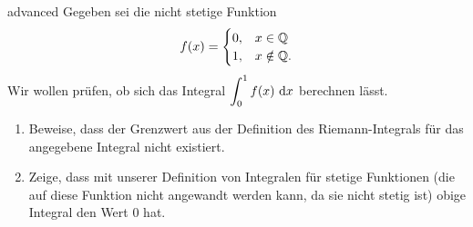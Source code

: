 \documentclass[../lineare_gleichungen.tex]{subfiles}
\begin{document}
\begin{exercise}{advanced}
    Gegeben sei die nicht stetige Funktion
    \[f(x)=\begin{cases}
        0,&x\in\mathbb{Q}\\
        1,&x\notin\mathbb{Q}.
    \end{cases}\]
    Wir wollen prüfen, ob sich das Integral
    $\displaystyle\int_0^1f(x)\mathop{}\mathrm{d} x$
    berechnen lässt.
    \begin{enumerate}
        \item Beweise, dass der Grenzwert aus der Definition des Riemann-Integrals für das angegebene Integral nicht existiert.
        \item Zeige, dass mit unserer Definition von Integralen für stetige Funktionen (die auf diese Funktion nicht 
        angewandt werden kann, da sie nicht stetig ist) obige Integral den Wert $0$ hat.
    \end{enumerate}
\end{exercise}
\end{document}
